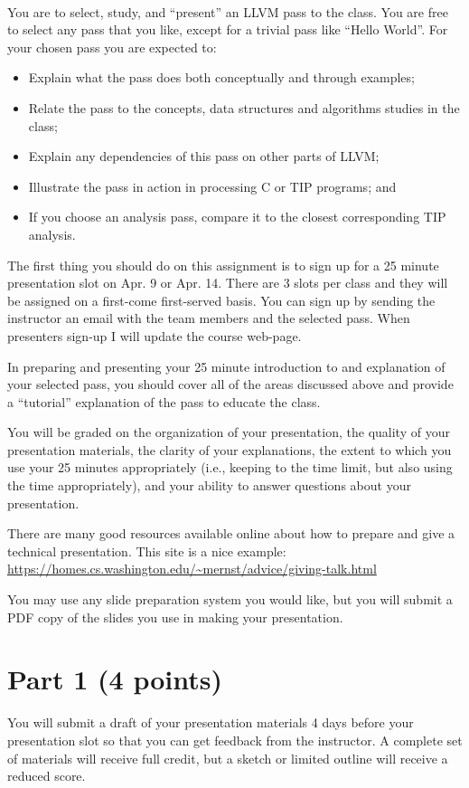 \documentclass[12pt,letterpaper]{article}
\begin{document}
~

You are to select, study, and ``present'' an LLVM pass to the class.
You are free to select any pass that you like, except for a trivial
pass like ``Hello World''.
For your chosen pass you are expected to:
\begin{itemize}
\item Explain what the pass does both conceptually and through examples;
\item Relate the pass to the concepts, data structures and algorithms studies in the class;
\item Explain any dependencies of this pass on other parts of LLVM;
\item Illustrate the pass in action in processing C or TIP programs; and
\item If you choose an analysis pass, compare it to the closest corresponding TIP analysis. 
\end{itemize}

The first thing you should do on this assignment is to sign up for
a 25 minute presentation slot on Apr. 9 or Apr. 14.  There are
3 slots per class and they will be assigned on a first-come first-served
basis.  
You can sign up by sending the instructor an email with the 
team members and the selected pass.  
When presenters sign-up I will update the course web-page.

In preparing and presenting your 25 minute introduction 
to and explanation of your selected pass, you should cover all 
of the areas discussed above and 
provide a ``tutorial'' explanation of the pass to educate the class.

You will be graded on the organization of your presentation,
the quality of your presentation materials,
the clarity of your explanations,
the extent to which you use your 25 minutes appropriately (i.e., keeping
to the time limit, but also using the time appropriately),
and your ability to answer questions about your presentation. 

There are many good resources available online about how to prepare
and give a technical presentation.  This site is a nice example:
\url{https://homes.cs.washington.edu/~mernst/advice/giving-talk.html}

You may use any slide preparation system you would like, but you 
will submit a PDF copy of the slides you use in making your presentation.

\section*{Part 1 (4 points)}
You will submit a draft of your presentation materials 4 days before
your presentation slot so that you can get feedback from the instructor.
A complete set of materials will receive full credit, but a sketch or
limited outline will receive a reduced score.
\end{document}
